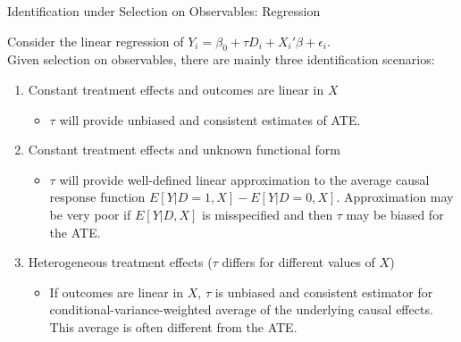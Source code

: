 \documentclass{beamer}
\numberwithin{equation}{section}
\begin{document}
\begin{frame}{Identification under Selection on Observables: Regression}

Consider the linear regression of
$Y_i = \beta_0 + \tau D_i  + X_i' \beta + \epsilon_i$.\\

Given \alert{selection on observables}, there are mainly three identification
scenarios: \pause

\begin{enumerate}
\def\labelenumi{\arabic{enumi}.}
\itemsep1pt\parskip0pt
\item
  Constant treatment effects and outcomes are linear in $X$

  \begin{itemize}
  \itemsep1pt\parskip0pt
  \item
    $\tau$ will provide unbiased and consistent estimates of ATE.
    \bigskip
  \end{itemize}
\item
  Constant treatment effects and unknown functional form

  \begin{itemize}
  \itemsep1pt\parskip0pt
  \item
    $\tau$ will provide well-defined linear approximation to the
    average causal response function $E[Y|D=1,X]-E[Y|D=0,X]$.
    Approximation may be very poor if $E[Y|D,X]$ is misspecified and
    then $\tau$ may be biased for the ATE. \pause
  \end{itemize}
\item
  Heterogeneous treatment effects ($\tau$ differs for different values
  of $X$)

  \begin{itemize}
  \itemsep1pt\parskip0pt
  \item
    If outcomes are linear in $X$, $\tau$ is unbiased and consistent
    estimator for conditional-variance-weighted average of the
    underlying causal effects. This average is often different from the
    ATE.
  \end{itemize}
\end{enumerate}

\end{frame}
\end{document}
